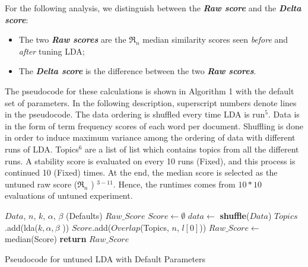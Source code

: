\documentclass[10pt,conference]{IEEEtran}
\newcommand{\bi}{\begin{itemize}}
\newcommand{\ei}{\end{itemize}}
\theoremstyle{break}
\begin{document}
 For the following analysis,
we distinguish between the \textbf{\textit{Raw  score}} and the \textbf{\textit{Delta  score}}:
 \bi
\item The two \textbf{\textit{Raw  scores}} are the $\Re_n$ median similarity scores seen {\em before} and {\em after} tuning LDA;
\item The \textbf{\textit{Delta score}} is the difference between the two
  \textbf{\textit{Raw scores}}.  \ei 
  The pseudocode for these calculations
  is shown in Algorithm 1 with the default set of parameters. In the following
  description, superscript numbers denote lines in the pseudocode. The data ordering is
  shuffled every time LDA is run$^{5}$. Data is in the form of term frequency
  scores of each word per document. Shuffling is done in order to induce maximum
  variance among the ordering of data with  different runs of LDA. Topics$^{6}$ are a list of list which
  contains topics from all the different runs. A stability score is evaluated on
  every 10 runs (Fixed), and this process is continued 10 (Fixed) times. At the end, the median
  score is selected as the untuned raw score ($\Re_n$ ) $^{3-11}$. Hence, the runtimes comes from $10 * 10$ evaluations of untuned experiment.

\makeatletter
\algrenewcommand\ALG@beginalgorithmic{\footnotesize}
\algrenewcommand{}
\makeatother
\renewcommand{\algorithmicrequire}{\textbf{Input:}}
\renewcommand{\algorithmicensure}{\textbf{Output:}}
\begin{algorithm}
    
    \begin{algorithmic}[1]
    \Require $Data$, $n$, $k$, $\alpha$, $\beta$ (Defaults) 
    \Ensure $Raw\_Score$    
        \State $Score \leftarrow \emptyset$
                \State $data \leftarrow$ \textbf{shuffle}($Data$)
                \State $Topics$.add(lda($k,\alpha,\beta$ ))
            \EndFor
            \State $Score$.add($Overlap$(Topics, $n$, $l[0]$))
        \EndFor
        \State $Raw\_Score \leftarrow $ median(Score)
        \State \textbf{return} $Raw\_Score$
    \EndFunction
    \caption{Pseudocode for untuned LDA with Default Parameters}
    \end{algorithmic}
\end{algorithm}
\end{document}
